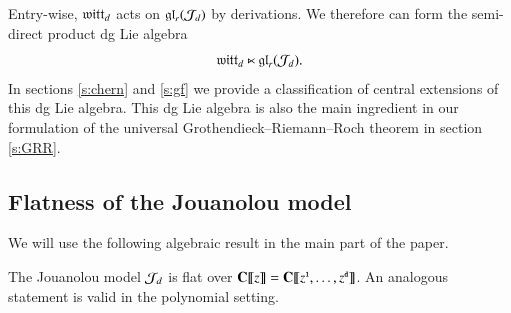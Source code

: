 \documentclass[main.tex]{subfiles}
\begin{document}
Entry-wise, $\mathfrak{witt}_d$ acts on $\mathfrak{gl}_r (\mathcal J_d)$ by derivations.
We therefore can form the semi-direct product dg Lie algebra
\begin{equation}\label{}
  \mathfrak{witt}_d \ltimes \mathfrak{gl}_r(\mathcal J_d) .
\end{equation}
In sections \ref{s:chern} and \ref{s:gf} we provide a classification of central extensions of this dg Lie algebra.
This dg Lie algebra is also the main ingredient in our formulation of the universal Grothendieck--Riemann--Roch theorem
in section \ref{s:GRR}.

\subsection{Flatness of the Jouanolou model}
We will use the following algebraic result in the main part of the paper.

\begin{proposition}\label{prop:flatness}
The Jouanolou model $\mathcal J_d$ is flat over $\mathbf{C}\llbracket z\rrbracket=\mathbf{C}\llbracket z^{{\textbf{\texttt{\tiny{1}}}}},\dots,z^{\textbf{\texttt{\tiny{d}}}}\rrbracket$. An analogous statement is valid in the polynomial setting.
\end{proposition}
\end{document}
